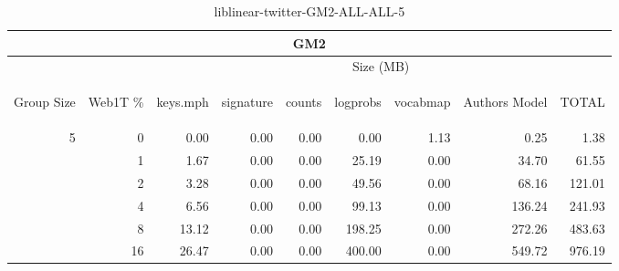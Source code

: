 \begin{center}
\begin{table}[htbp] 
 \begin{center}
\begin{tabular}{ | r | r | r | r | r | r | r | r | r |}
\hline
\multicolumn{9}{|c|}{GM2}\\
\hline
 & & \multicolumn{7}{|c|}{Size (MB)}\\ \cline{3-9}
\begin{sideways}Group Size\end{sideways} & \begin{sideways}Web1T \% \end{sideways} & \begin{sideways}keys.mph\end{sideways} & \begin{sideways}signature\end{sideways} & \begin{sideways}counts\end{sideways} & \begin{sideways}logprobs\end{sideways} & \begin{sideways}vocabmap\end{sideways} & \begin{sideways}Authors Model \end{sideways} & \begin{sideways}TOTAL\end{sideways}\\
\hline
\multirow{5}{*}{5}
 & 0 & 0.00 & 0.00 & 0.00 & 0.00 & 1.13 & 0.25 & 1.38\\ \cline{2-9}
 & 1 & 1.67 & 0.00 & 0.00 & 25.19 & 0.00 & 34.70 & 61.55\\ \cline{2-9}
 & 2 & 3.28 & 0.00 & 0.00 & 49.56 & 0.00 & 68.16 & 121.01\\ \cline{2-9}
 & 4 & 6.56 & 0.00 & 0.00 & 99.13 & 0.00 & 136.24 & 241.93\\ \cline{2-9}
 & 8 & 13.12 & 0.00 & 0.00 & 198.25 & 0.00 & 272.26 & 483.63\\ \cline{2-9}
 & 16 & 26.47 & 0.00 & 0.00 & 400.00 & 0.00 & 549.72 & 976.19\\ \cline{2-9}
\hline
\end{tabular}
\caption{liblinear-twitter-GM2-ALL-ALL-5}
\label{table:liblinear-twitter-GM2-ALL-ALL-5}
\end{center}
 \end{table}
\end{center}

